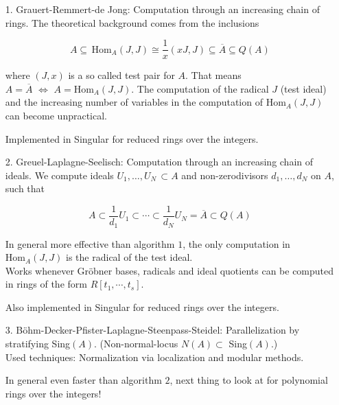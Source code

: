 \documentclass[12pt]{article}
\begin{document}
\begin{enumerate}
\item[1.] Grauert-Remmert-de Jong: Computation through an increasing chain of rings. The 
theoretical background comes from the inclusions

$$A\subseteq\,\text{Hom}_A(J,J)\cong \frac{1}{x}(xJ,J)\subseteq\overline{A}\subseteq Q(A)$$

where $(J,x)$ is a so called test pair for $A$. That means $A=\overline{A}\,\,\Longleftrightarrow\,\,A=\text{Hom}_A(J,J)$.
The computation of the radical $J$ (test ideal) and the increasing number of variables
in the computation of $\text{Hom}_A(J,J)$ can become unpractical.

Implemented in Singular for reduced rings over the integers.\\

\item[2.] Greuel-Laplagne-Seelisch: Computation through an increasing chain of ideals.
We compute ideals $U_1,\ldots,U_N\,\subset A$ and non-zerodivisors $d_1,\ldots,d_N$ on $A$, such that

$$A\subset\frac{1}{d_1}U_1\subset\cdots\subset\frac{1}{d_N}U_N=\overline{A}\subset Q(A)$$

In general more effective than algorithm $1$, the only computation in $\text{Hom}_A(J,J)$ is the 
radical of the test ideal.\\
Works whenever Gr\"obner bases, radicals and ideal quotients can be computed in rings of the form $R[t_1,\cdots,t_s]$.

Also implemented in Singular for reduced rings over the integers.\\

\item[3.] B\"ohm-Decker-Pfister-Laplagne-Steenpass-Steidel: Parallelization by stra\-tifying Sing$(A)$.
(Non-normal-locus $N(A)\subset$ Sing$(A)$.)\\
Used techniques: Normalization via localization and modular me\-thods.

In general even faster than algorithm $2$, next thing to look at for polynomial rings over the integers!

\end{enumerate}
\end{document}
